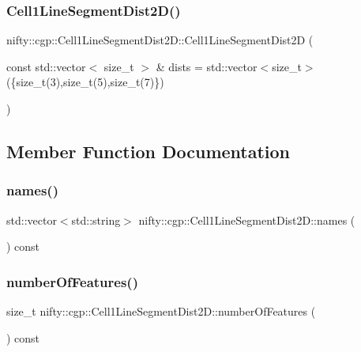 \subsubsection{\texorpdfstring{Cell1\+Line\+Segment\+Dist2\+D()}{Cell1LineSegmentDist2D()}}
{\footnotesize\ttfamily nifty\+::cgp\+::\+Cell1\+Line\+Segment\+Dist2\+D\+::\+Cell1\+Line\+Segment\+Dist2D (\begin{DoxyParamCaption}\item[{const std\+::vector$<$ size\+\_\+t $>$ \&}]{dists = {\ttfamily std\+:\+:vector$<$size\+\_\+t$>$(\{size\+\_\+t(3),size\+\_\+t(5),size\+\_\+t(7)\})} }\end{DoxyParamCaption})\hspace{0.3cm}{\ttfamily [inline]}}



\subsection{Member Function Documentation}
\mbox{\label{classnifty_1_1cgp_1_1Cell1LineSegmentDist2D_a8eebda085eaee5893d2e046f900ee4a0}} 
\subsubsection{\texorpdfstring{names()}{names()}}
{\footnotesize\ttfamily std\+::vector$<$std\+::string$>$ nifty\+::cgp\+::\+Cell1\+Line\+Segment\+Dist2\+D\+::names (\begin{DoxyParamCaption}{ }\end{DoxyParamCaption}) const\hspace{0.3cm}{\ttfamily [inline]}}

\mbox{\label{classnifty_1_1cgp_1_1Cell1LineSegmentDist2D_a8a6c270911d7eef4eed6de8e989f0b98}} 
\subsubsection{\texorpdfstring{number\+Of\+Features()}{numberOfFeatures()}}
{\footnotesize\ttfamily size\+\_\+t nifty\+::cgp\+::\+Cell1\+Line\+Segment\+Dist2\+D\+::number\+Of\+Features (\begin{DoxyParamCaption}{ }\end{DoxyParamCaption}) const\hspace{0.3cm}{\ttfamily [inline]}}

